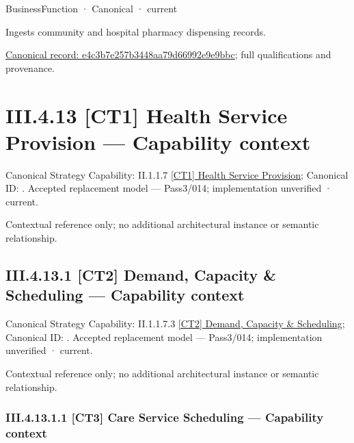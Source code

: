 \label{element:e4c3b7e257b3448aa79d66992e9e9bbc}
{\small BusinessFunction · Canonical · current}\par

Ingests community and hospital pharmacy dispensing records.


{\footnotesize \href{../../../../../../../continuum/business/business-function/e4c3b7e257b3448aa79d66992e9e9bbc.md}{Canonical record: e4c3b7e257b3448aa79d66992e9e9bbc}; full qualifications and provenance.}\par
\section*{III.4.13 [CT1] Health Service Provision — Capability context}
\label{navigation:III.4.13}

{\small Canonical Strategy Capability: II.1.1.7 \hyperref[element:c832a767d295445d8925dd0af885950e]{[CT1] Health Service Provision}; Canonical ID: \texttt{}. Accepted replacement model — Pass3/014; implementation unverified · current.}\par
Contextual reference only; no additional architectural instance or semantic relationship.\par
\subsection*{III.4.13.1 [CT2] Demand, Capacity \& Scheduling — Capability context}
\label{navigation:III.4.13.1}

{\small Canonical Strategy Capability: II.1.1.7.3 \hyperref[element:f94ce7fcb1904141aeae8f2602518126]{[CT2] Demand, Capacity \& Scheduling}; Canonical ID: \texttt{}. Accepted replacement model — Pass3/014; implementation unverified · current.}\par
Contextual reference only; no additional architectural instance or semantic relationship.\par
\subsubsection*{III.4.13.1.1 [CT3] Care Service Scheduling — Capability context}
\label{navigation:III.4.13.1.1}

